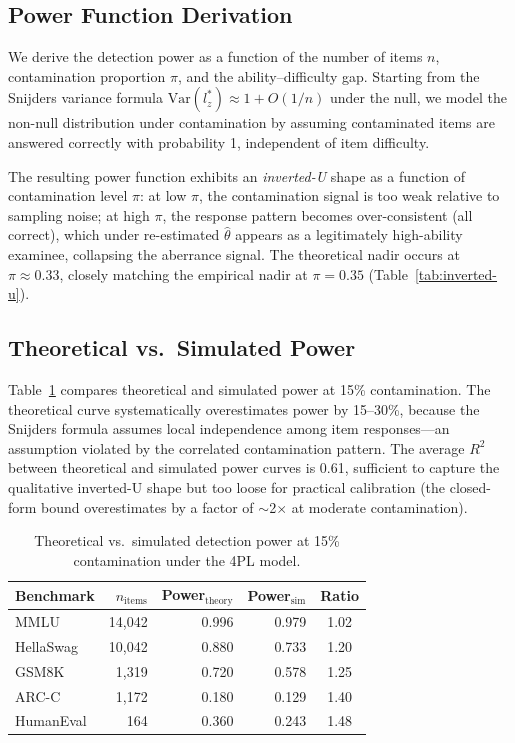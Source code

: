 \documentclass[11pt]{article}
\begin{document}
\subsection{Power Function Derivation}

We derive the detection power as a function of the number of items $n$, contamination proportion $\pi$, and the ability--difficulty gap.
Starting from the Snijders variance formula $\text{Var}(l_z^*) \approx 1 + O(1/n)$ under the null, we model the non-null distribution under contamination by assuming contaminated items are answered correctly with probability 1, independent of item difficulty.

The resulting power function exhibits an \emph{inverted-U} shape as a function of contamination level $\pi$:
at low $\pi$, the contamination signal is too weak relative to sampling noise;
at high $\pi$, the response pattern becomes over-consistent (all correct), which under re-estimated $\hat{\theta}$ appears as a legitimately high-ability examinee, collapsing the aberrance signal.
The theoretical nadir occurs at $\pi \approx 0.33$, closely matching the empirical nadir at $\pi = 0.35$ (Table~\ref{tab:inverted-u}).

\subsection{Theoretical vs.\ Simulated Power}

Table~\ref{tab:theory-vs-sim} compares theoretical and simulated power at 15\% contamination.
The theoretical curve systematically overestimates power by 15--30\%, because the Snijders formula assumes local independence among item responses---an assumption violated by the correlated contamination pattern.
The average $R^2$ between theoretical and simulated power curves is 0.61, sufficient to capture the qualitative inverted-U shape but too loose for practical calibration (the closed-form bound overestimates by a factor of $\sim$2$\times$ at moderate contamination).

\begin{table}[t]
\centering
\caption{Theoretical vs.\ simulated detection power at 15\% contamination under the 4PL model.}
\label{tab:theory-vs-sim}
\begin{tabular}{lrrrc}
\toprule
Benchmark & $n_\text{items}$ & Power$_\text{theory}$ & Power$_\text{sim}$ & Ratio \\
\midrule
MMLU       & 14,042 & 0.996 & 0.979 & 1.02 \\
HellaSwag  & 10,042 & 0.880 & 0.733 & 1.20 \\
GSM8K      &  1,319 & 0.720 & 0.578 & 1.25 \\
ARC-C      &  1,172 & 0.180 & 0.129 & 1.40 \\
HumanEval  &    164 & 0.360 & 0.243 & 1.48 \\
\bottomrule
\end{tabular}
\end{table}
\end{document}
